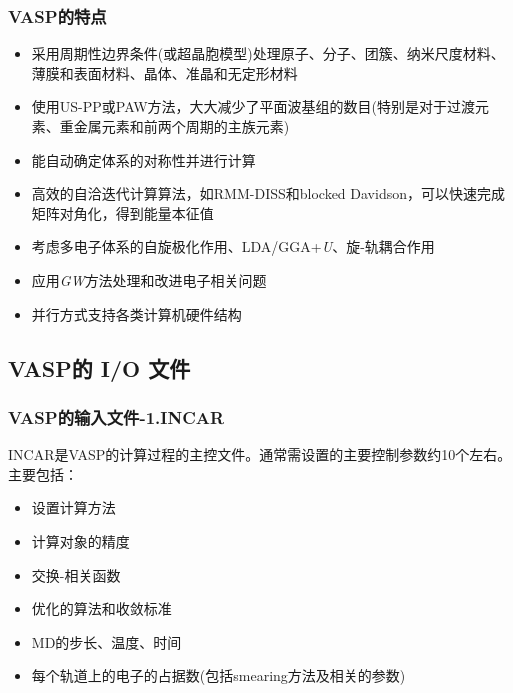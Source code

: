\documentclass[cjk,slidestop,compress,mathserif,blue]{beamer}
\begin{document}
\frame
{
\frametitle{VASP的特点}
\begin{itemize}
	\item 采用周期性边界条件(或超晶胞模型)处理原子、分子、团簇、纳米尺度材料、薄膜和表面材料、晶体、准晶和无定形材料
	\item 使用\textrm{US-PP}或\textrm{PAW}方法，大大减少了平面波基组的数目(特别是对于过渡元素、重金属元素和前两个周期的主族元素)
	\item 能自动确定体系的对称性并进行计算
	\item 高效的自洽迭代计算算法，如\textrm{RMM-DISS}和\textrm{blocked Davidson}，可以快速完成矩阵对角化，得到能量本征值
	\item 考虑多电子体系的自旋极化作用、\textrm{LDA/GGA+}\textit{U}、旋-轨耦合作用
	\item 应用\textit{GW}方法处理和改进电子相关问题
	\item 并行方式支持各类计算机硬件结构
\end{itemize}
}

\subsection{VASP的 I/O 文件}
\frame
{
\frametitle{VASP的输入文件-1.INCAR}
\textrm{INCAR}是\textrm{VASP}的计算过程的主控文件。通常需设置的主要控制参数约10个左右。主要包括：
\begin{itemize}
   \setlength{\itemsep}{8pt}
	\item 设置计算方法
	\item 计算对象的精度
	\item 交换-相关函数
	\item 优化的算法和收敛标准
	\item \textrm{MD}的步长、温度、时间
	\item 每个轨道上的电子的占据数(包括\textrm{smearing}方法及相关的参数)
\end{itemize}
}
\end{document}
